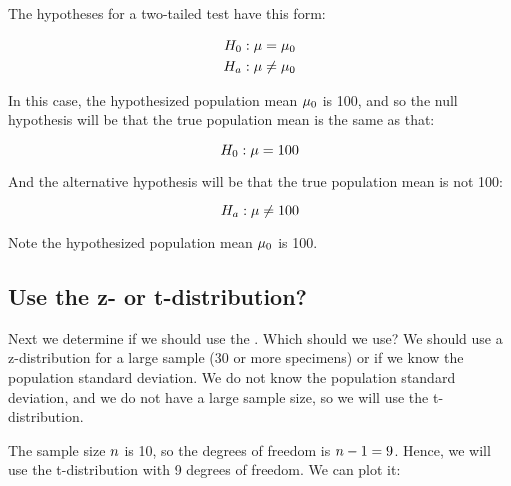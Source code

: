 \documentclass[../../../main.tex]{subfiles}
\begin{document}
The hypotheses for a two-tailed test have this form:

\begin{align*}
  \NullHyp/: \populationmean = \HypPopMean/ \\
  \AltHyp/: \populationmean \not = \HypPopMean/ 
\end{align*}

\noindent
In this case, the hypothesized population mean $\HypPopMean/$ is 100, and so the null hypothesis will be that the true population mean is the same as that:

\begin{equation*}
  \NullHyp/: \populationmean = 100
\end{equation*}

\noindent
And the alternative hypothesis will be that the true population mean is not 100:

\begin{equation*}
  \AltHyp/: \populationmean \not = 100
\end{equation*}

\noindent
Note the hypothesized population mean $\HypPopMean/$ is 100.

\subsection{Use the z- or t-distribution?}

Next we determine if we should use the . Which should we use? We should use a z-distribution for a large sample (30 or more specimens) or if we know the population standard deviation. We do not know the population standard deviation, and we do not have a large sample size, so we will use the t-distribution.

The sample size $\samplesize/$ is 10, so the degrees of freedom is $\samplesize/ - 1 = 9$. Hence, we will use the t-distribution with 9 degrees of freedom. We can plot it:

\begin{center}
\end{center}
\end{document}

